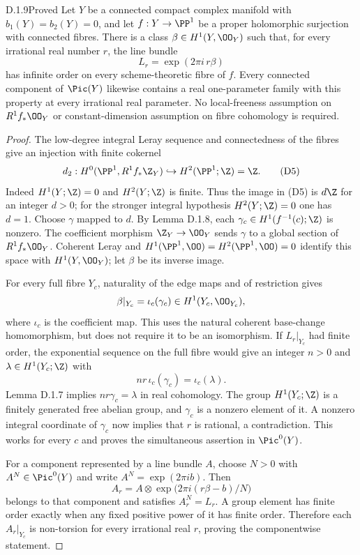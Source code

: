 \begin{idstatement}{D.1.9}{Proved}\label{st:D.1.9}
Let $Y$ be a connected compact complex manifold with
$b_1(Y)=b_2(Y)=0$, and let $f:Y\to\PP^1$ be a proper
holomorphic surjection with connected fibres. There is a class
$\beta\in H^1(Y,\OO_Y)$ such that, for every irrational real number
$r$, the line bundle
\[
L_r=\exp(2\pi i\,r\beta)
\]
has infinite order on every scheme-theoretic fibre of $f$.
Every connected component of $\Pic(Y)$ likewise contains a real
one-parameter family with this property at every irrational real
parameter.
No local-freeness assumption on $R^1f_*\OO_Y$ or constant-dimension
assumption on fibre cohomology is required.
\end{idstatement}
\begin{proof}
The low-degree integral Leray sequence and connectedness of the
fibres give an injection with finite cokernel
\[
d_2:H^0(\PP^1,R^1f_*\Z_Y)
 \hookrightarrow H^2(\PP^1;\Z)=\Z.                   \tag{D5}
\]
Indeed $H^1(Y;\Z)=0$ and $H^2(Y;\Z)$ is finite.
Thus the image in (D5) is $d\Z$ for an integer $d>0$; for the
stronger integral hypothesis $H^2(Y;\Z)=0$ one has $d=1$.
Choose $\gamma$ mapped to $d$. By Lemma D.1.8,
each $\gamma_c\in H^1(f^{-1}(c);\Z)$ is nonzero.
The coefficient morphism $\Z_Y\to\OO_Y$ sends $\gamma$ to a
global section of $R^1f_*\OO_Y$. Coherent Leray and
$H^1(\PP^1,\OO)=H^2(\PP^1,\OO)=0$ identify this space with
$H^1(Y,\OO_Y)$; let $\beta$ be its inverse image.

For every full fibre $Y_c$, naturality of the edge maps and of
restriction gives
\[
\beta|_{Y_c}=\iota_c(\gamma_c)\in H^1(Y_c,\OO_{Y_c}), 
\]
where $\iota_c$ is the coefficient map. This uses the natural
coherent base-change homomorphism, but does not require it to be
an isomorphism. If $L_r|_{Y_c}$ had finite order, the exponential
sequence on the full fibre would give an integer $n>0$ and
$\lambda\in H^1(Y_c;\Z)$ with
\[
nr\,\iota_c(\gamma_c)=\iota_c(\lambda).
\]
Lemma D.1.7 implies $nr\gamma_c=\lambda$ in real cohomology.
The group $H^1(Y_c;\Z)$ is a finitely generated free abelian group,
and $\gamma_c$ is a nonzero element of it. A nonzero integral
coordinate of $\gamma_c$ now implies that $r$ is rational, a
contradiction. This works for every $c$ and proves the simultaneous
assertion in $\Pic^0(Y)$.

For a component represented by a line bundle $A$, choose $N>0$
with $A^N\in\Pic^0(Y)$ and write $A^N=\exp(2\pi i b)$.
Then
\[
A_r=A\otimes\exp\bigl(2\pi i(r\beta-b)/N\bigr)
\]
belongs to that component and satisfies $A_r^N=L_r$. A group
element has finite order exactly when any fixed positive power of
it has finite order. Therefore each $A_r|_{Y_c}$ is non-torsion
for every irrational real $r$, proving the componentwise statement.
\end{proof}


